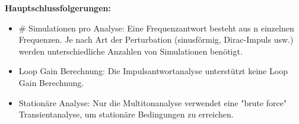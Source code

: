 \documentclass[a4paper,11pt,oneside]{article}
\begin{document}
	\begin{table}[H]
		\centering
		\caption{Übersicht der Analyse-Tools}
	\end{table}
	
	\textbf{Hauptschlussfolgerungen:}
	\begin{itemize}
		\item \# Simulationen pro Analyse: Eine Frequenzantwort besteht aus n einzelnen Frequenzen. Je nach Art der Perturbation (sinusförmig, Dirac-Impuls usw.) werden unterschiedliche Anzahlen von Simulationen benötigt.
		\item Loop Gain Berechnung: Die Impulsantwortanalyse unterstützt keine Loop Gain Berechnung.
		\item Stationäre Analyse: Nur die Multitonanalyse verwendet eine "brute force" Transientanalyse, um stationäre Bedingungen zu erreichen.
	\end{itemize}






	\newpage
	\printbibliography
\end{document}
